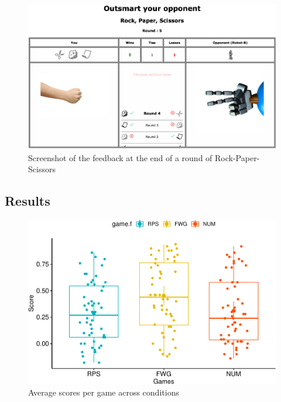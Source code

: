 \documentclass[man,floatsintext]{apa6}
\begin{document}
\begin{figure}

{\centering \includegraphics{../Report/images/feedback_rps} 

}

\caption{Screenshot of the feedback at the end of a round of Rock-Paper-Scissors}\label{fig:feedback-rps}
\end{figure}

\hypertarget{results}{%
\subsection{Results}\label{results}}

\begin{figure}

{\centering \includegraphics{draft_report_v1_files/figure-latex/exp1-avg-scores-game-1} 

}

\caption{Average scores per game across conditions}\label{fig:exp1-avg-scores-game}
\end{figure}
\end{document}

